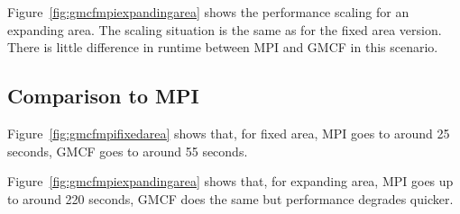 Figure~\ref{fig:gmcfmpiexpandingarea} shows the performance scaling for an
expanding area. The scaling situation is the same as for the fixed area version.
There is little difference in runtime between MPI and GMCF in this scenario.

\subsection{Comparison to MPI}

Figure~\ref{fig:gmcfmpifixedarea} shows that, for fixed area, MPI goes to around
25 seconds, GMCF goes to around 55 seconds.

Figure~\ref{fig:gmcfmpiexpandingarea} shows that, for expanding area, MPI goes
up to around 220 seconds, GMCF does the same but performance degrades quicker.
